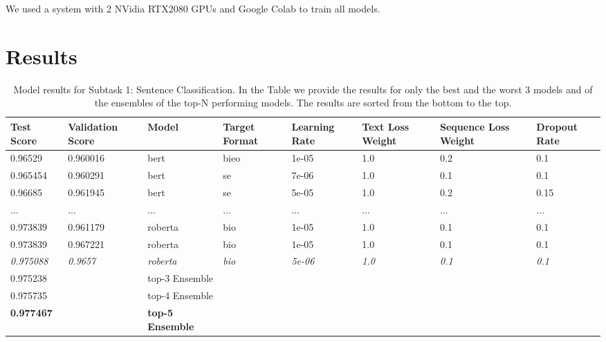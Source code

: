 \documentclass[11pt]{article}
\begin{document}
We used a system with 2 NVidia RTX2080 GPUs and Google Colab to train all models.

\section{Results}

\begin{table}[h]
	\centering
	\begin{tabular}{|p{1.4cm}|p{1.4cm}|p{1.8cm}|p{1.2cm}|p{1.3cm}|p{1.5cm}|p{2.0cm}|p{1.1cm}|}
		\hline
		Test Score & Validation Score & Model & Target Format & Learning Rate & Text Loss Weight & Sequence Loss Weight & Dropout Rate \\ 	\hline
		0.96529 & 0.960016 & bert & bieo & 1e-05 & 1.0 & 0.2 & 0.1\\ \hline 0.965454 & 0.960291 & bert & se & 7e-06 & 1.0 & 0.1 & 0.1\\ \hline
		0.96685 & 0.961945 & bert & se & 5e-05 & 1.0 & 0.2 & 0.15\\ \hline\hline
		...&...&...&...&...&...&...&... \\ \hline
		0.973839 & 0.961179 & roberta & bio & 1e-05 & 1.0 & 0.1 & 0.1\\ \hline
		0.973839 & 0.967221 & roberta & bio & 1e-05 & 1.0 & 0.1 & 0.1\\ \hline
		\textit{0.975088} & \textit{0.9657} & \textit{roberta} & \textit{bio} & \textit{5e-06} & \textit{1.0} & \textit{0.1} & \textit{0.1}\\ \hline\hline
		0.975238 & & top-3 Ensemble &&&&&\\ \hline
		0.975735 & & top-4 Ensemble &&&&&\\ \hline
		\textbf{0.977467} & & \textbf{top-5 Ensemble} &&&&&\\ \hline
		
	\end{tabular}
	\label{tab:subtask1}
	\caption{Model results for Subtask 1: Sentence Classification. In the Table we provide the results for only the best and the worst 3 models and of the ensembles of the top-N performing models. The results are sorted from the bottom to the top.}
\end{table}
\end{document}
